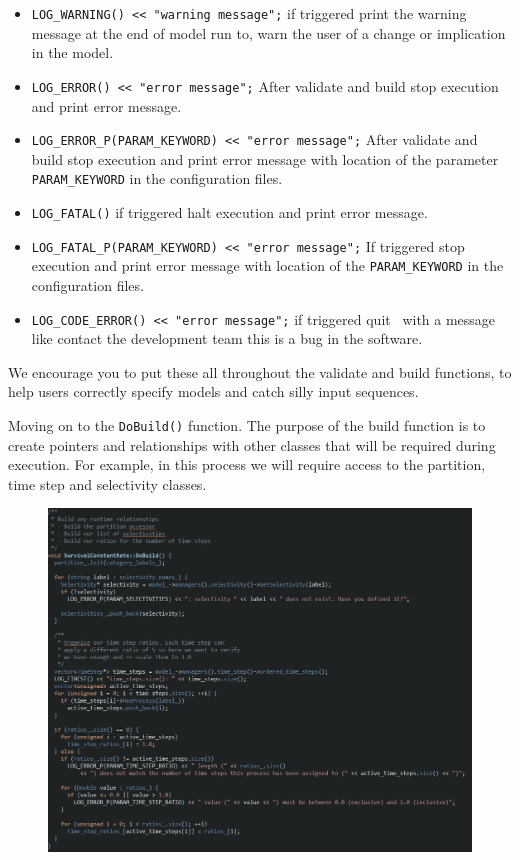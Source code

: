 \begin{itemize}
	\item \texttt{LOG\_WARNING() << "warning message";} if triggered print the warning message at the end of model run to, warn the user of a change or implication in the model.
	\item \texttt{LOG\_ERROR() << "error message";} After validate and build stop execution and print error message.
	\item \texttt{LOG\_ERROR\_P(PARAM\_KEYWORD) << "error message";} After validate and build stop execution and print error message with location of the parameter \texttt{PARAM\_KEYWORD} in the configuration files.
	\item \texttt{LOG\_FATAL()} if triggered halt execution and print error message.
	\item \texttt{LOG\_FATAL\_P(PARAM\_KEYWORD) << "error message";} If triggered stop execution and print error message with location of the \texttt{PARAM\_KEYWORD} in the configuration files.		
	\item \texttt{LOG\_CODE\_ERROR() << "error message";} if triggered quit \CNAME\ with a message like contact the development team this is a bug in the software.	
\end{itemize}

We encourage you to put these all throughout the validate and build functions, to help users correctly specify models and catch silly input sequences.

Moving on to the \texttt{DoBuild()} function. The purpose of the build function is to create pointers and relationships with other classes that will be required during execution. For example, in this process we will require access to the partition, time step and selectivity classes.

\begin{figure}[!ht]
	\centering
	\includegraphics[scale=0.6]{Figures/Build.png}
	\caption{}\label{fig:build}
\end{figure}

